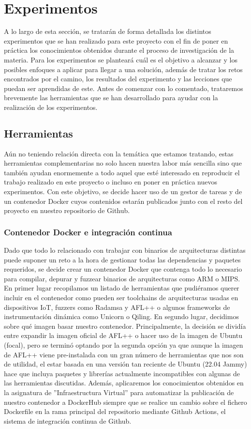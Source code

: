 \chapter{Experimentos}
\label{experimentos}
A lo largo de esta sección, se tratarán de forma detallada los distintos experimentos que se han realizado para este proyecto con el fin de 
poner en práctica los conocimientos obtenidos durante el proceso de investigación de la materia. Para los experimentos se planteará cuál es el 
objetivo a alcanzar y los posibles enfoques a aplicar para llegar a una solución, además de tratar los retos encontrados por el camino, los 
resultados del experimento y las lecciones que puedan ser aprendidas de este. Antes de comenzar con lo comentado, trataremos brevemente
las herramientas que se han desarrollado para ayudar con la realización de los experimentos.

\section{Herramientas}
\label{herramientas}
Aún no teniendo relación directa con la temática que estamos tratando, estas herramientas complementarias no solo 
hacen nuestra labor más sencilla sino que también ayudan enormemente a todo aquel que esté interesado en reproducir el trabajo realizado en este proyecto
o incluso en poner en práctica nuevos experimentos. Con este objetivo, se decide hacer uso de un gestor de tareas y de un contenedor Docker cuyos contenidos estarán
publicados junto con el resto del proyecto en nuestro repositorio de Github.

\subsection{Contenedor Docker e integración continua}
Dado que todo lo relacionado con trabajar con binarios de arquitecturas distintas puede suponer un reto a la hora de gestionar todas las dependencias
y paquetes requeridos, se decide crear un contenedor Docker que contenga todo lo necesario para compilar, depurar y fuzzear binarios de arquitecturas como 
ARM o MIPS. En primer lugar recopilamos un listado de herramientas que pudiéramos querer incluir en el contenedor como pueden ser toolchains de arquitecturas
usadas en dispositivos IoT, 
fuzzers como Radamsa y AFL++ o algunos frameworks de instrumentación dinámica como Unicorn o Qiling. En segundo lugar, decidimos sobre qué
imagen basar nuestro contenedor. Principalmente, la decisión se dividía entre expandir la imagen oficial de AFL++ o hacer uso de la imagen de Ubuntu (focal), pero se 
terminó optando por la segunda opción ya que aunque la imagen de AFL++ viene pre-instalada con un gran número de herramientas que nos son de utilidad, el 
estar basada en una versión tan reciente de Ubuntu (22.04 Jammy) hace que incluya paquetes y librerías actualmente incompatibles con algunas de las 
herramientas discutidas. Además, aplicaremos los conocimientos obtenidos en la asignatura de ''Infraestructura Virtual'' para automatizar la publicación de nuestro
contenedor a DockerHub siempre que se realice un cambio sobre el fichero Dockerfile en la rama principal del repositorio mediante Github Actions,
el sistema de integración continua de Github.

